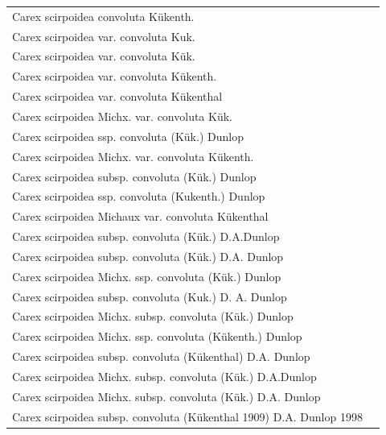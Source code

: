 \documentclass{bmcart}
\begin{document}
\begin{table}[!htb]
\begin{center}
\begin{tabular}{| l | c |}
    Carex scirpoidea convoluta Kükenth. & \\
    Carex scirpoidea var. convoluta Kuk. & \\
    Carex scirpoidea var. convoluta Kük. & \\
    Carex scirpoidea var. convoluta Kükenth. & \\
    Carex scirpoidea var. convoluta Kükenthal & \\
    Carex scirpoidea Michx. var. convoluta Kük. & \\
    Carex scirpoidea ssp. convoluta (Kük.) Dunlop & \\
    Carex scirpoidea Michx. var. convoluta Kükenth. & \\
    Carex scirpoidea subsp. convoluta (Kük.) Dunlop & \\
    Carex scirpoidea ssp. convoluta (Kukenth.) Dunlop & \\
    Carex scirpoidea Michaux var. convoluta Kükenthal & \\
    Carex scirpoidea subsp. convoluta (Kük.) D.A.Dunlop & \\
    Carex scirpoidea subsp. convoluta (Kük.) D.A. Dunlop & \\
    Carex scirpoidea Michx. ssp. convoluta (Kük.) Dunlop & \\
    Carex scirpoidea subsp. convoluta (Kuk.) D. A. Dunlop & \\
    Carex scirpoidea Michx. subsp. convoluta (Kük.) Dunlop & \\
    Carex scirpoidea Michx. ssp. convoluta (Kükenth.) Dunlop & \\
    Carex scirpoidea subsp. convoluta (Kükenthal) D.A. Dunlop & \\
    Carex scirpoidea Michx. subsp. convoluta (Kük.) D.A.Dunlop & \\
    Carex scirpoidea Michx. subsp. convoluta (Kük.) D.A. Dunlop & \\
    Carex scirpoidea subsp. convoluta (Kükenthal 1909) D.A. Dunlop 1998 & \\
    \hline
    \end{tabular}
  \end{center}
\end{table}
\end{document}
